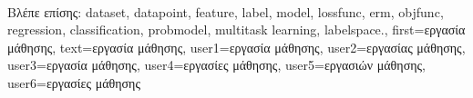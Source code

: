 {{%
		\\
	 	\foreignlanguage{greek}{Βλέπε επίσης:} \gls{dataset}, \gls{datapoint}, \gls{feature}, \gls{label}, \gls{model}, 
		\gls{lossfunc}, \gls{erm}, \gls{objfunc}, \gls{regression}, \gls{classification}, \gls{probmodel}, \gls{multitask learning}, \gls{labelspace}.},
	first={\foreignlanguage{greek}{εργασία μάθησης}},
	text={\foreignlanguage{greek}{εργασία μάθησης}},
	user1={\foreignlanguage{greek}{εργασία μάθησης}}, %
	user2={\foreignlanguage{greek}{εργασίας μάθησης}}, %
	user3={\foreignlanguage{greek}{εργασία μάθησης}}, %
	user4={\foreignlanguage{greek}{εργασίες μάθησης}}, %
	user5={\foreignlanguage{greek}{εργασιών μάθησης}}, %
	user6={\foreignlanguage{greek}{εργασίες μάθησης}} %
}

